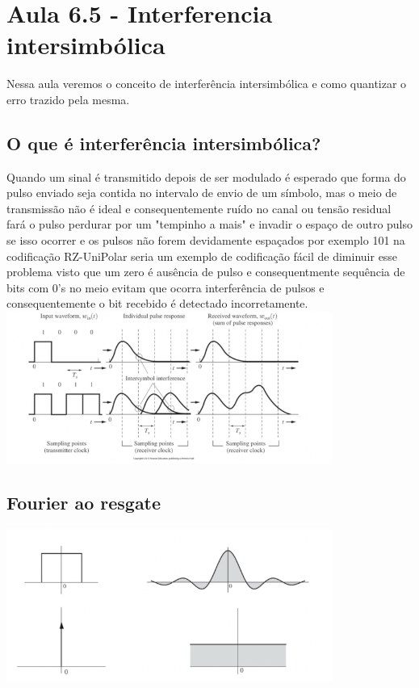 \section{Aula 6.5 - Interferencia intersimbólica}

Nessa aula veremos o conceito de interferência intersimbólica e como quantizar o erro trazido pela mesma.

\subsection{O que é interferência intersimbólica?}

Quando um sinal é transmitido depois de ser modulado é esperado que  forma do pulso enviado seja contida no intervalo de envio de um símbolo, mas o meio de transmissão não é ideal
e consequentemente ruído no canal ou tensão residual fará o pulso perdurar por um "tempinho a mais" e invadir o espaço de outro pulso se isso ocorrer e os pulsos não forem devidamente
espaçados por exemplo 101 na codificação RZ-UniPolar seria um exemplo  de codificação fácil de diminuir esse problema visto que um zero é ausência de pulso e consequentmente sequência de bits
com 0's no meio evitam que ocorra interferência de pulsos e consequentemente o bit recebido é detectado incorretamente.
\\

\includegraphics[width=0.8\textwidth]{../assets/iis.png}\cite{dc}

\subsection{Fourier ao resgate}


\includegraphics[width=0.8\textwidth]{../assets/fourier.png}\cite{dc}

